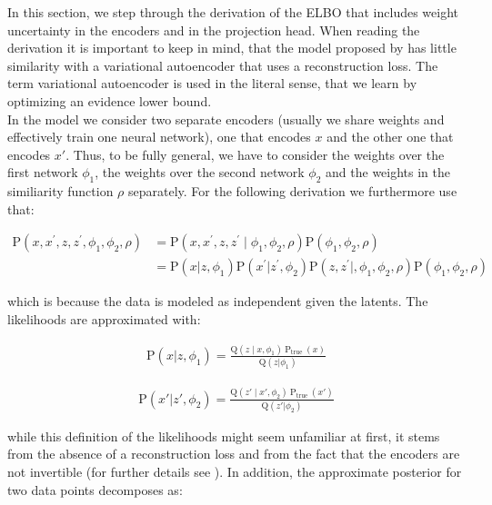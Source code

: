 \documentclass[tablecaption=bottom,wcp]{jmlr} %
\begin{document}
In this section, we step through the derivation of the ELBO that includes weight uncertainty in the encoders and in the projection head. When reading the derivation it is important to keep in mind, that the model proposed by \citet{aitchison2023infonce} has little similarity with a variational autoencoder that uses a reconstruction loss. The term variational autoencoder is used in the literal sense, that we learn by optimizing an evidence lower bound. \\

In the model we consider two separate  encoders (usually we share weights and effectively train one neural network), one that encodes $x$ and the other one that encodes $x'$.  Thus, to be fully general, we have to consider the weights over the first network $\phi_{1}$, the weights over the second network $\phi_{2}$ and the weights in the similiarity function $\rho$ separately. For the following derivation we furthermore use that:



\begin{align}
\mathrm{P}\left(x, x^{\prime},z,z^{\prime},\phi_{1},\phi_{2},\rho \right) 
&= \mathrm{P}\left(x, x^{\prime},z,z^{\prime}\mid \phi_{1},\phi_{2}, \rho \right)\mathrm{P}\left( \phi_{1}, \phi_{2}, \rho \right) \\ 
&= \mathrm{P}\left(x|z,\phi_{1} \right)\mathrm{P}\left(x^{\prime}|z^{\prime},\phi_{2} \right)\mathrm{P}\left(z,z^{\prime}|,\phi_{1},\phi_{2},\rho \right)\mathrm{P}\left(\phi_{1},\phi_{2},\rho \right)
\end{align}

which is because the data is modeled as independent given the latents. The likelihoods are approximated with: 


\begin{align}
\mathrm{P}\left(x|z,\phi_{1} \right)= \frac{\mathrm{Q}(z \mid x,\phi_{1}) \ \mathrm{P}_{\text {true }}\left(x\right)}{\mathrm{Q}(z|\phi_{1})} 
\end{align}

\begin{align}
\mathrm{P}\left(x'|z',\phi_{2} \right)= \frac{\mathrm{Q}(z' \mid x',\phi_{2}) \ \mathrm{P}_{\text {true }}\left(x'\right)}{\mathrm{Q}(z'|\phi_{2})}
\end{align}

while this definition of the likelihoods might seem unfamiliar at first, it stems from the absence of a reconstruction loss and from the fact that the encoders are not invertible (for further details see \citet{aitchison2023infonce}). In addition, the approximate  posterior for two data points decomposes as:
\end{document}

